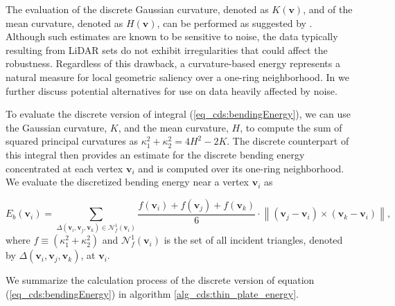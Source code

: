\documentclass[graybox]{svmult}
\begin{document}
	
	The evaluation of the discrete Gaussian curvature, denoted as $K(\mathbf{v})$, and  of the mean curvature, denoted as $H(\mathbf{v})$, can be performed as suggested by \cite{Meyer2003}. Although such estimates are known to be sensitive to noise, the data typically resulting from LiDAR sets do not exhibit irregularities that could affect the robustness. Regardless of this drawback, a curvature-based energy represents a natural measure for local geometric saliency over a one-ring neighborhood. In \cite{Cioaca2016, Cioaca2016CEAI} we further discuss potential alternatives for use on data heavily affected by noise.
	
	To evaluate the discrete version of integral (\ref{eq_cds:bendingEnergy}), we can use the Gaussian curvature, $K$, and the mean curvature, $H$, to compute the sum of squared principal curvatures as $\kappa_1^2 + \kappa_2^2 = 4H^2 - 2K  $. The discrete counterpart of this integral then provides an estimate for the discrete bending energy concentrated at each vertex $\mathbf{v}_i$ and is computed over its one-ring neighborhood. We evaluate the discretized bending energy near a vertex $\mathbf{v}_i$ as 
	
	\begin{equation}
	\label{eq_cds:bendingEnergyDiscrete}
	E_{b}(\mathbf{{v}}_i) = \sum_{\Delta({\mathbf{{v}}_i,\mathbf{{v}}_j,\mathbf{{v}}_k}) \in \mathcal{N}_f^1(\mathbf{{v}}_i)} 
	\frac{f(\mathbf{{v}}_i) + f(\mathbf{{v}}_j) + f(\mathbf{{v}}_k)}{6} \cdot \left\lVert (\mathbf{{v}}_j - \mathbf{{v}}_i) \times (\mathbf{{v}}_k - \mathbf{{v}}_i) \right\rVert,
	\end{equation}
	where $f \equiv (\kappa_1^2 + \kappa_2^2)$ and  $\mathcal{N}_f^1(\mathbf{{v}}_i)$ is the set of all incident triangles, denoted by $\Delta({\mathbf{{v}}_i,\mathbf{{v}}_j,\mathbf{{v}}_k})$,  at $\mathbf{v}_i$.
	
	
	We summarize the calculation process of the discrete version of equation (\ref{eq_cds:bendingEnergy}) in algorithm \ref{alg_cds:thin_plate_energy}.
	
\end{document}
